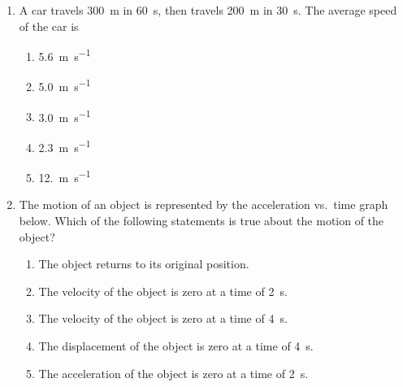 \documentclass{../../oss-apphys}
\begin{document}
\begin{multicols}{2}
\begin{enumerate}[resume,leftmargin=18pt]
  \item A car travels \SI{300}{\metre} in \SI{60}{\second}, then travels
    \SI{200}{\metre} in \SI{30}{\second}. The average speed of the car is
    \begin{enumerate}[noitemsep,topsep=0pt,leftmargin=18pt,label=(\Alph*)]
    \item\SI{5.6}{\metre\per\second}
    \item\SI{5.0}{\metre\per\second}
    \item\SI{3.0}{\metre\per\second}
    \item\SI{2.3}{\metre\per\second}
    \item\SI{12.}{\metre\per\second}
    \end{enumerate}
    
  \item The motion of an object is represented by the acceleration vs.\ time
    graph below. Which of the following statements is true about the
    motion of the object?
    \begin{center}
    \end{center}
    \begin{enumerate}[noitemsep,topsep=0pt,leftmargin=18pt,label=(\Alph*)]
    \item The object returns to its original position.
    \item The velocity of the object is zero at a time of \SI{2}{\second}.
    \item The velocity of the object is zero at a time of \SI{4}{\second}.
    \item The displacement of the object is zero at a time of \SI{4}{\second}.
    \item The acceleration of the object is zero at a time of \SI{2}{\second}.
    \end{enumerate}

\end{enumerate}
\end{multicols}
\end{document}
